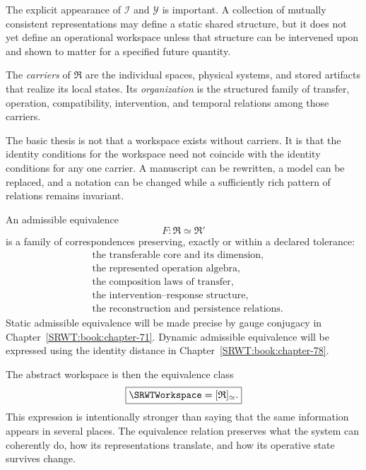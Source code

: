 The explicit appearance of \(\mathcal I\) and \(\mathcal Y\) is important.
A collection of mutually consistent representations may define a static
shared structure, but it does not yet define an operational workspace unless
that structure can be intervened upon and shown to matter for a specified
future quantity.

\begin{SRWTdefinition}\label{SRWT:def:carrier-organization}
The \emph{carriers} of \(\mathfrak R\) are the individual spaces, physical
systems, and stored artifacts that realize its local states. Its
\emph{organization} is the structured family of transfer, operation,
compatibility, intervention, and temporal relations among those carriers.
\end{SRWTdefinition}

The basic thesis is not that a workspace exists without carriers. It is that
the identity conditions for the workspace need not coincide with the identity
conditions for any one carrier. A manuscript can be rewritten, a model can
be replaced, and a notation can be changed while a sufficiently rich pattern
of relations remains invariant.

\begin{SRWTdefinition}\label{SRWT:def:admissible-equivalence}
An admissible equivalence
\[
F:\mathfrak R\simeq\mathfrak R'
\]
is a family of correspondences preserving, exactly or within a declared
tolerance:
\[
\begin{aligned}
&\text{the transferable core and its dimension},\\
&\text{the represented operation algebra},\\
&\text{the composition laws of transfer},\\
&\text{the intervention--response structure},\\
&\text{the reconstruction and persistence relations}.
\end{aligned}
\]
Static admissible equivalence will be made precise by gauge conjugacy in
Chapter~\ref{SRWT:book:chapter-71}. Dynamic admissible equivalence will be expressed using the identity
distance in Chapter~\ref{SRWT:book:chapter-78}.
\end{SRWTdefinition}

The abstract workspace is then the equivalence class
\[
\boxed{
\SRWTWorkspace=[\mathfrak R]_{\simeq}.
}
\]
This expression is intentionally stronger than saying that the same
information appears in several places. The equivalence relation preserves
what the system can coherently do, how its representations translate, and how
its operative state survives change.

